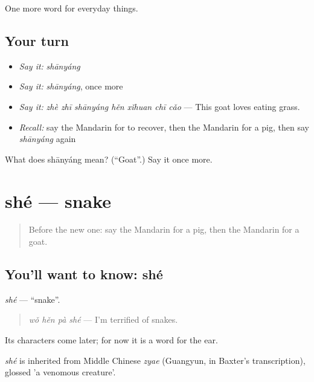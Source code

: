 \begin{grammarlens}[title={What you've built}]
One more word for everyday things.
\end{grammarlens}

\subsection*{Your turn}
\begin{itemize}
\raggedright
  \item \emph{Say it:} \emph{shānyáng}
  \item \emph{Say it:} \emph{shānyáng}, once more
  \item \emph{Say it:} \emph{zhè zhī shānyáng hěn xǐhuan chī cǎo} — This goat loves eating grass.
  \item \emph{Recall:} say the Mandarin for to recover, then the Mandarin for a pig, then say \emph{shānyáng} again
\end{itemize}

\begin{tcolorbox}[breakable,colback=teal!4,colframe=teal!35!black,title={Before you move on}]
What does shānyáng mean? (\textquotedblleft{}Goat\textquotedblright{}.) Say it once more.
\end{tcolorbox}
\section[shé]{shé — snake}

\label{lesson:ZH-C242-she}



\begin{quote}
Before the new one: say the Mandarin for a pig, then the Mandarin for a goat.
\end{quote}

\subsection*{You'll want to know: shé}
\emph{shé} — \textquotedblleft{}snake\textquotedblright{}.

\begin{quote}
\emph{wǒ hěn pà shé} — I'm terrified of snakes.
\end{quote}

Its characters come later; for now it is a word for the ear.

\begin{cousinweb}
\emph{shé} is inherited from Middle Chinese \emph{zyae} (Guangyun, in Baxter's transcription), glossed 'a venomous creature'.
\end{cousinweb}

